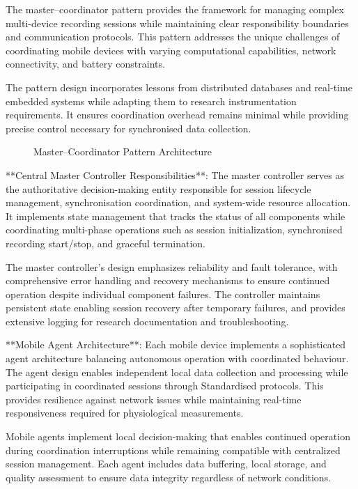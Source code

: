 \documentclass[11pt,a4paper]{report}
\begin{document}
The master--coordinator pattern provides the framework for managing complex multi-device recording sessions while maintaining clear responsibility boundaries and communication protocols. This pattern addresses the unique challenges of coordinating mobile devices with varying computational capabilities, network connectivity, and battery constraints.

The pattern design incorporates lessons from distributed databases and real-time embedded systems while adapting them to research instrumentation requirements. It ensures coordination overhead remains minimal while providing precise control necessary for synchronised data collection. 

\begin{figure}[ht]
\centering
\framebox[0.9\textwidth][c]{\rule{0pt}{4cm}}
\caption{Master–Coordinator Pattern Architecture}
\label{fig:master-coordinator}
\end{figure}

**Central Master Controller Responsibilities**: The master controller serves as the authoritative decision-making entity responsible for session lifecycle management, synchronisation coordination, and system-wide resource allocation. It implements state management that tracks the status of all components while coordinating multi-phase operations such as session initialization, synchronised recording start/stop, and graceful termination.

The master controller’s design emphasizes reliability and fault tolerance, with comprehensive error handling and recovery mechanisms to ensure continued operation despite individual component failures. The controller maintains persistent state enabling session recovery after temporary failures, and provides extensive logging for research documentation and troubleshooting.

**Mobile Agent Architecture**: Each mobile device implements a sophisticated agent architecture balancing autonomous operation with coordinated behaviour. The agent design enables independent local data collection and processing while participating in coordinated sessions through Standardised protocols. This provides resilience against network issues while maintaining real-time responsiveness required for physiological measurements.

Mobile agents implement local decision-making that enables continued operation during coordination interruptions while remaining compatible with centralized session management. Each agent includes data buffering, local storage, and quality assessment to ensure data integrity regardless of network conditions.
\end{document}
